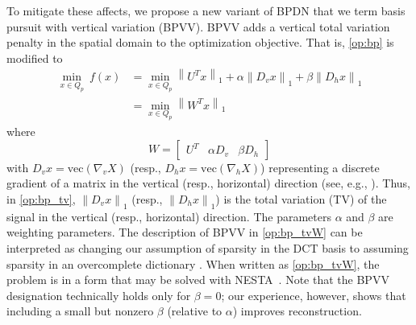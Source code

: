 \documentclass[journal]{IEEEtran}
\begin{document}
To mitigate these affects, we propose a new variant of BPDN that we
term basis pursuit with vertical variation (BPVV). BPVV adds a
vertical total variation penalty in the spatial domain to the
optimization objective. That is, \eqref{op:bp} is modified to 
\begin{align}
  \min_{x\in Q_p}~f(x) &= \min_{x\in Q_p} \left\|U^Tx\right\|_1
                         + \alpha\left\|D_vx\right\|_1
                         + \beta\left\|D_hx\right\|_1 \label{op:bp_tv}\\
                       &=\min_{x\in Q_p} \left\|W^Tx\right\|_1 \label{op:bp_tvW}
\end{align}
where
\begin{equation*}
  W = \begin{bmatrix}U^T&\alpha D_v&\beta D_h \end{bmatrix}
\end{equation*}
with ${D_v x=\text{vec}(\nabla_v X)}$ (resp.,
${D_h x=\text{vec}(\nabla_h X)}$) representing a discrete gradient of
a matrix in the vertical (resp., horizontal) direction (see, e.g.,
\cite[Sec. 6.1,]{becker_nesta_2011}). 
Thus, in \eqref{op:bp_tv}, $\left \| D_v x \right \|_1$ (resp.,
$\left \| D_h x \right \|_1$) is the total variation (TV) of the
signal in the vertical (resp., horizontal) direction. The parameters
$\alpha$ and $\beta$ are weighting parameters. The description of BPVV
in \eqref{op:bp_tvW} can be interpreted as changing our assumption of
sparsity in the DCT basis to assuming sparsity in an overcomplete
dictionary \cite{candes_redundant_2011}.  When written as
\eqref{op:bp_tvW}, the problem is in a form that may be solved with
NESTA~\cite{becker_nesta_2011}. Note that the BPVV designation technically holds only for $\beta=0$; our experience, however, shows that including a small but nonzero $\beta$ (relative to $\alpha$) improves reconstruction.
\end{document}
